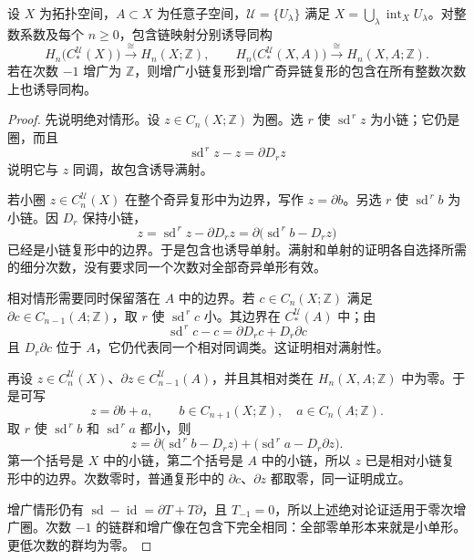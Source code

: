 \begin{theorem}\label{g2:thm:small-chain-isomorphism}
	设 \(X\) 为拓扑空间，\(A\subset X\) 为任意子空间，\(\mathcal U=\{U_\lambda\}\) 满足 \(X=\bigcup_\lambda\operatorname{int}_XU_\lambda\)。对整数系数及每个 \(n\ge0\)，包含链映射分别诱导同构
	\[
		H_n\bigl(C_*^{\mathcal U}(X)\bigr)\xrightarrow{\ \cong\ }H_n(X;\mathbb Z),
		\qquad
		H_n\bigl(C_*^{\mathcal U}(X,A)\bigr)\xrightarrow{\ \cong\ }H_n(X,A;\mathbb Z).
	\]
	若在次数 \(-1\) 增广为 \(\mathbb Z\)，则增广小链复形到增广奇异链复形的包含在所有整数次数上也诱导同构。
\end{theorem}
\begin{proof}
	先说明绝对情形。设 \(z\in C_n(X;\mathbb Z)\) 为圈。选 \(r\) 使 \(\operatorname{sd}^{\,r}z\) 为小链；它仍是圈，而且
	\[
		\operatorname{sd}^{\,r}z-z=\partial D_rz
	\]
	说明它与 \(z\) 同调，故包含诱导满射。

	若小圈 \(z\in C_n^{\mathcal U}(X)\) 在整个奇异复形中为边界，写作 \(z=\partial b\)。另选 \(r\) 使 \(\operatorname{sd}^{\,r}b\) 为小链。因 \(D_r\) 保持小链，
	\[
		z=\operatorname{sd}^{\,r}z-\partial D_rz
		=\partial\bigl(\operatorname{sd}^{\,r}b-D_rz\bigr)
	\]
	已经是小链复形中的边界。于是包含也诱导单射。满射和单射的证明各自选择所需的细分次数，没有要求同一个次数对全部奇异单形有效。

	相对情形需要同时保留落在 \(A\) 中的边界。若 \(c\in C_n(X;\mathbb Z)\) 满足 \(\partial c\in C_{n-1}(A;\mathbb Z)\)，取 \(r\) 使 \(\operatorname{sd}^{\,r}c\) 小。其边界在 \(C_*^{\mathcal U}(A)\) 中；由
	\[
		\operatorname{sd}^{\,r}c-c=\partial D_rc+D_r\partial c
	\]
	且 \(D_r\partial c\) 位于 \(A\)，它仍代表同一个相对同调类。这证明相对满射性。

	再设 \(z\in C_n^{\mathcal U}(X)\)、\(\partial z\in C_{n-1}^{\mathcal U}(A)\)，并且其相对类在 \(H_n(X,A;\mathbb Z)\) 中为零。于是可写
	\[
		z=\partial b+a,\qquad
		b\in C_{n+1}(X;\mathbb Z),\quad a\in C_n(A;\mathbb Z).
	\]
	取 \(r\) 使 \(\operatorname{sd}^{\,r}b\) 和 \(\operatorname{sd}^{\,r}a\) 都小，则
	\[
		z=\partial\bigl(\operatorname{sd}^{\,r}b-D_rz\bigr)
			+\bigl(\operatorname{sd}^{\,r}a-D_r\partial z\bigr).
	\]
	第一个括号是 \(X\) 中的小链，第二个括号是 \(A\) 中的小链，所以 \(z\) 已是相对小链复形中的边界。次数零时，普通复形中的 \(\partial c\)、\(\partial z\) 都取零，同一证明成立。

	增广情形仍有 \(\operatorname{sd}-\operatorname{id}=\partial T+T\partial\)，且 \(T_{-1}=0\)，所以上述绝对论证适用于零次增广圈。次数 \(-1\) 的链群和增广像在包含下完全相同：全部零单形本来就是小单形。更低次数的群均为零。
\end{proof}

